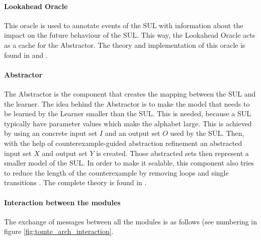 \documentclass[multi,crop=false,class=article]{standalone}
\begin{document}
\paragraph{Lookahead Oracle} This oracle is used to annotate events of the SUL
with information about the impact on the future behaviour of the SUL. This way,
the Lookahead Oracle acts as a cache for the Abstractor. The theory and
implementation of this oracle is found in \cite{Aarts2014} and \cite{Tomte2014}.

\paragraph{Abstractor} The Abstractor is the component that creates the mapping
between the SUL and the learner. The idea behind the Abstractor is to make the 
model that needs to be learned by the Learner smaller than the SUL. This is 
needed, because a SUL typically have parameter values which make the alphabet 
large. This is achieved by using an concrete input set $I$ and an output set 
$O$ used by the SUL. Then, with the help of counterexample-guided abstraction 
refinement\cite{Tomte2014} an abstracted input set $X$ and output set $Y$ is 
created. Those abstracted sets then represent a smaller model of the SUL.
In order to make it scalable, this component also tries to reduce the length of 
the counterexample by removing loops and single transitions \cite{Koopman2014}. 
The complete theory is found in \cite{Tomte2014}.

\paragraph{Interaction between the modules} The exchange of messages between
all the modules is as follows (see numbering in figure
\ref{fig:tomte_arch_interaction}.
\end{document}
